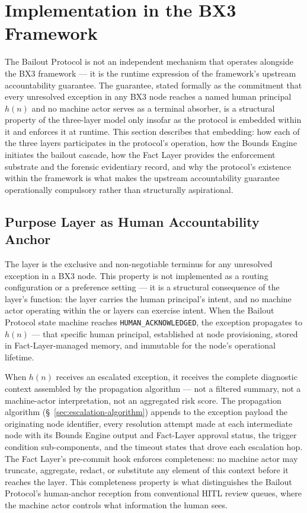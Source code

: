 \section{Implementation in the BX3 Framework}
\label{sec:bailout-implementation}

The Bailout Protocol is not an independent mechanism that operates alongside the BX3 framework — it is the runtime expression of the framework's upstream accountability guarantee. The guarantee, stated formally as the commitment that every unresolved exception in any BX3 node reaches a named human principal $h(n)$ and no machine actor serves as a terminal absorber, is a structural property of the three-layer model only insofar as the protocol is embedded within it and enforces it at runtime. This section describes that embedding: how each of the three layers participates in the protocol's operation, how the Bounds Engine initiates the bailout cascade, how the Fact Layer provides the enforcement substrate and the forensic evidentiary record, and why the protocol's existence within the framework is what makes the upstream accountability guarantee operationally compulsory rather than structurally aspirational.

\subsection{Purpose Layer as Human Accountability Anchor}
\label{sec:bailout-purpose-layer}

The \purpose{} layer is the exclusive and non-negotiable terminus for any unresolved exception in a BX3 node. This property is not implemented as a routing configuration or a preference setting — it is a structural consequence of the layer's function: the \purpose{} layer carries the human principal's intent, and no machine actor operating within the \bounds{} or \fact{} layers can exercise intent. When the Bailout Protocol state machine reaches \texttt{HUMAN\_ACKNOWLEDGED}, the exception propagates to $h(n)$ — that specific human principal, established at node provisioning, stored in Fact-Layer-managed memory, and immutable for the node's operational lifetime.

When $h(n)$ receives an escalated exception, it receives the complete diagnostic context assembled by the propagation algorithm — not a filtered summary, not a machine-actor interpretation, not an aggregated risk score. The propagation algorithm (\S~\ref{sec:escalation-algorithm}) appends to the exception payload the originating node identifier, every resolution attempt made at each intermediate node with its Bounds Engine output and Fact-Layer approval status, the trigger condition sub-components, and the timeout states that drove each escalation hop. The Fact Layer's pre-commit hook enforces completeness: no machine actor may truncate, aggregate, redact, or substitute any element of this context before it reaches the \purpose{} layer. This completeness property is what distinguishes the Bailout Protocol's human-anchor reception from conventional HITL review queues, where the machine actor controls what information the human sees.

